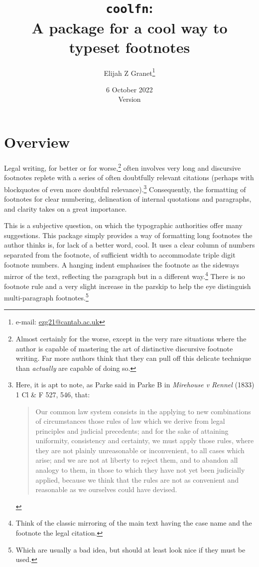 \documentclass[12pt]{article}
\date{6 October 2022\\\smallskip\ttfamily Version \coolfnversionnumber}
\author{Elijah Z Granet\thanks{e-mail: \href{mailto:ezg21@cantab.ac.uk}{\ttfamily ezg21@cantab.ac.uk}}}
\title{\texttt{coolfn}:\\A package for a cool way to typeset footnotes}
\begin{document}
\maketitle
\tableofcontents
\clearpage
\section{Overview}
Legal writing, for better or for worse,\footnote{Almost certainly for the worse, except in the very rare situations where the author is capable of mastering the art of distinctive discursive footnote writing.  Far more authors think that they can pull off this delicate technique than \textit{actually} are capable of doing so. } often involves very long and discursive footnotes replete with a series of often doubtfully relevant citations (perhaps with blockquotes of  even more doubtful relevance).\footnote{Here, it is apt to note, as Parke  said in Parke B in \textit{Mirehouse v Rennel} (1833) 1 Cl \& F 527, 546, that:
\begin{quote}
Our common law system consists in the applying to new combinations of circumstances those rules of law which we derive from legal principles and judicial precedents; and for the sake of attaining uniformity, consistency and certainty, we must apply those rules, where they are not plainly unreasonable or inconvenient, to all cases which arise; and we are not at liberty to reject them, and to abandon all analogy to them, in those to which they have not yet been judicially applied, because we think that the rules are not as convenient and reasonable as we ourselves could have devised.\end{quote}} Consequently, the formatting of footnotes for clear numbering, delineation of internal quotations and paragraphs, and clarity takes on a great importance.

This is a subjective question, on which the typographic authorities offer many suggestions. This package simply provides a way of formatting long footnotes the author thinks is, for lack of a better word, cool. It uses a clear column of numbers separated from the footnote, of sufficient width to accommodate triple digit footnote numbers.  A hanging indent emphasises the footnote as the sideways mirror of the text, reflecting the paragraph but in a different way.\footnote{Think of the classic mirroring of the main text having the case name and the footnote the legal citation.} There is no footnote rule and a very slight increase in the parskip to help the eye distinguish multi-paragraph footnotes.\footnote{Which are usually a bad idea, but should at least look nice if they must be used.}
\end{document}
